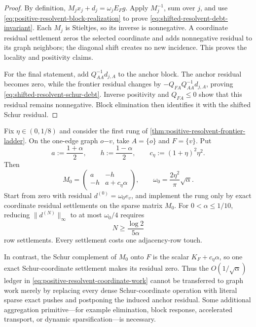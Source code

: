 \begin{proof}
By definition,
$M_jx_j+d_j=\omega_jE_Fg$.  Apply $M_j^{-1}$, sum over $j$, and use
\cref{eq:positive-resolvent-block-realization} to prove
\cref{eq:shifted-resolvent-debt-invariant}.  Each $M_j$ is Stieltjes, so its
inverse is nonnegative.  A coordinate residual settlement zeros the selected
coordinate and adds nonnegative residual to its graph neighbors; the diagonal
shift creates no new incidence.  This proves the locality and positivity
claims.

For the final statement, add $Q_{AA}^{-1}d_{j,A}$ to the anchor block.  The
anchor residual becomes zero, while the frontier residual changes by
$-Q_{FA}Q_{AA}^{-1}d_{j,A}$, proving
\cref{eq:shifted-resolvent-schur-debt}.  Inverse positivity and
$Q_{FA}\leq0$ show that this residual remains nonnegative.  Block elimination
then identifies it with the shifted Schur residual.
\end{proof}

\begin{proposition}
\label{prop:one-edge-shifted-debt-obstruction}
Fix $\eta\in(0,1/8)$ and consider the first rung of
\cref{thm:positive-resolvent-frontier-ladder}.  On the one-edge graph
$o\mathord{-}v$, take $A=\{o\}$ and $F=\{v\}$.  Put
\begin{equation*}
 a:=\frac{1+\alpha}{2},
 \qquad
 h:=\frac{1-\alpha}{2},
 \qquad
 c_\eta:=(1+\eta)^2\eta^2.
\end{equation*}
Then
\begin{equation}
 M_0=
 \begin{pmatrix}a&-h\\-h&a+c_\eta\alpha\end{pmatrix},
 \qquad
 \omega_0=\frac{2\eta^2}{\pi}\sqrt\alpha.
 \label{eq:one-edge-first-shifted-rung}
\end{equation}
Start from zero with residual $d^{(0)}=\omega_0e_v$, and implement the rung
only by exact coordinate residual settlements on the sparse matrix $M_0$.
For $0<\alpha\leq1/10$, reducing
$\|d^{(N)}\|_\infty$ to at most $\omega_0/4$ requires
\begin{equation}
 N\geq \frac{\log 2}{5\alpha}
 \label{eq:one-edge-sparse-shifted-lower-bound}
\end{equation}
row settlements.  Every settlement costs one adjacency-row touch.

In contrast, the Schur complement of $M_0$ onto $F$ is the scalar
$K_F+c_\eta\alpha$, so one exact Schur-coordinate settlement makes its
residual zero.  Thus the $O(1/\sqrt\alpha)$ ledger in
\cref{eq:positive-resolvent-coordinate-work} cannot be transferred to graph
work merely by replacing every dense Schur-coordinate operation with literal
sparse exact pushes and postponing the induced anchor residual.  Some
additional aggregation primitive---for example elimination, block response,
accelerated transport, or dynamic sparsification---is necessary.
\end{proposition}

